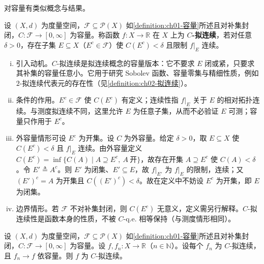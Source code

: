 \documentclass[../../main.tex]{subfiles}%
\begin{document}
对容量有类似概念与结果。

\begin{definition}\label{definition:ch02-C拟连续}
设 $(X,d)$ 为度量空间，$\mathscr F\subseteq\mathscr P(X)$ 如\cref{definition:ch01-容量}所述且对补集封闭，$C:\mathscr F\to[0,\infty]$ 为容量。称函数 $f:X\to\mathbb{R}$ 在 $X$ 上为 \textbf{$C$-拟连续}，若对任意 $\delta>0$，存在子集 $E\subseteq X$（$E^c\in\mathscr F$）使 $C(E^c)<\delta$ 且限制 $f|_E$ 连续。
\end{definition}

\begin{remark}\label{remark:ch02-外容量开集}
\begin{enumerate}[(i)]
\item 引入动机。$C$-拟连续是拟连续概念的容量版本：它不要求 $E$ 闭或紧，只要求其补集的容量任意小。它用于研究 Sobolev 函数、容量零集与精细性质，例如 $2$-拟连续代表元的存在性（见\cref{definition:ch02-拟连续}）。
\item 条件的作用。$E^c\in\mathscr F$ 使 $C(E^c)$ 有定义；连续性指 $f|_E$ 关于 $E$ 的相对拓扑连续。与测度拟连续不同，这里允许 $E$ 为任意子集，从而不必验证 $E$ 可测；容量只作用于 $E^c$。
\item 外容量情形可设 $E^c$ 为开集。设 $C$ 为外容量。给定 $\delta>0$，取 $E\subseteq X$ 使 $C(E^c)<\delta$ 且 $f|_E$ 连续。由外容量定义 $C(E^c)=\inf\{C(A)\mid A\supseteq E^c,\ A\ \text{开}\}$，故存在开集 $A\supseteq E^c$ 使 $C(A)<\delta$。令 $E'\triangleq A^c$。则 $E'$ 为闭集、$E'\subseteq E$，故 $f|_{E'}$ 为 $f|_E$ 的限制，连续；又 $(E')^c=A$ 为开集且 $C((E')^c)<\delta$。故在定义中不妨设 $E^c$ 为开集，即 $E$ 为闭集。
\item 边界情形。若 $\mathscr F$ 不对补集封闭，则 $C(E^c)$ 无意义，定义需另行解释。$C$-拟连续性是函数本身的性质，不被 $C$-q.e. 相等保持（与测度情形相同）。
\end{enumerate}
\end{remark}

\begin{proposition}\label{proposition:ch02-容量拟连续闭}
设 $(X,d)$ 为度量空间，$\mathscr F\subseteq\mathscr P(X)$ 如\cref{definition:ch01-容量}所述且对补集封闭，$C:\mathscr F\to[0,\infty]$ 为容量。设 $f,f_n:X\to\mathbb{R}$（$n\in\mathbb{N}$）。设每个 $f_n$ 为 $C$-拟连续，且 $f_n\to f$ 依容量。则 $f$ 为 $C$-拟连续。
\end{proposition}
\end{document}
